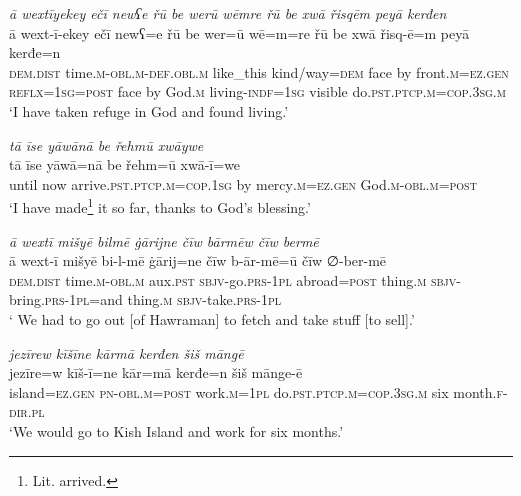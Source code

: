 \ea \label{ŽM.15}
\textit{ā wextīyekey ečī newʕe řū be werū wēmre řū be xwā řisqēm peyā kerđen} \\ 
\gll ā wext-ī-ekey ečī newʕ=e řū be wer=ū wē=m=re řū be xwā řisq-ē=m peyā kerđe=n \\ 
 \textsc{dem.dist} time\textsc{.m}\textsc{-obl}\textsc{.m}\textsc{-def}\textsc{.obl}\textsc{.m} like\_this kind/way\textsc{=dem} face by front\textsc{.m}\textsc{=ez.gen} \textsc{reflx}\textsc{=\textsc{1sg}}\textsc{=\textsc{post}} face by God\textsc{.m} living\textsc{-indf}\textsc{=\textsc{1sg}} visible do\textsc{.pst}\textsc{.ptcp}\textsc{.m}\textsc{=cop}\textsc{.3sg}\textsc{.m} \\ 
\glt `I have taken refuge in God and found living.'
\z 
 
\ea \label{ŽM.17}
\textit{tā īse yāwānā be řehmū xwāywe} \\ 
\gll tā īse yāwā=nā be řehm=ū xwā-ī=we \\ 
 until now arrive\textsc{.pst}\textsc{.ptcp}\textsc{.m}\textsc{=cop}\textsc{.\textsc{1sg}} by mercy\textsc{.m}\textsc{=ez.gen} God\textsc{.m}\textsc{-obl}\textsc{.m}\textsc{=\textsc{post}} \\ 
\glt `I have made\footnote{Lit. arrived.} it so far, thanks to God's blessing.'
\z 
 
\ea \label{ŽM.22}
\textit{ā wextī mišyē bilmē ġārijne čīw bārmēw čīw bermē} \\ 
\gll ā wext-ī mišyē bi-l-mē ġārij=ne čīw b-ār-mē=ū čīw ∅-ber-mē \\ 
 \textsc{dem.dist} time\textsc{.m}\textsc{-obl}\textsc{.m} aux\textsc{.pst} \textsc{sbjv-}go\textsc{.prs}\textsc{-\textsc{1pl}} abroad\textsc{=\textsc{post}} thing\textsc{.m} \textsc{sbjv-}bring\textsc{.prs}\textsc{-\textsc{1pl}}=and thing\textsc{.m} \textsc{sbjv-}take\textsc{.prs}\textsc{-\textsc{1pl}} \\ 
\glt ` We had to go out [of Hawraman] to fetch and take stuff [to sell].'
\z 
 
\ea \label{ŽM.25}
\textit{jezīrew kīšīne kārmā kerđen šiš māngē} \\ 
\gll jezīre=w kīš-ī=ne kār=mā kerđe=n šiš mānge-ē \\ 
 island\textsc{=ez.gen} \textsc{pn}\textsc{-obl}\textsc{.m}\textsc{=\textsc{post}} work\textsc{.m}\textsc{=\textsc{1pl}} do\textsc{.pst}\textsc{.ptcp}\textsc{.m}\textsc{=cop}\textsc{.3sg}\textsc{.m} six month\textsc{.f}\textsc{-dir}\textsc{.pl} \\ 
\glt `We would go to Kish Island and work for six months.'
\z 
 
